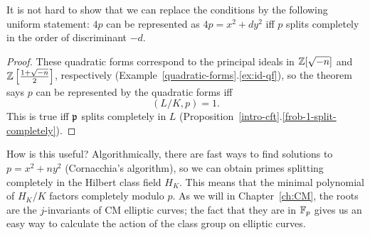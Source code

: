\begin{rem}
It is not hard to show that we can replace the conditions by the following uniform statement: $4p$ can be represented as $4p=x^2+dy^2$ iff $p$ splits completely in the order of discriminant $-d$. 
\end{rem}
\begin{proof}
These quadratic forms correspond to the principal ideals in $\mathbb{Z}[\sqrt{-n}]$ and $\mathbb{Z}\left[ {\frac{1+\sqrt{-n}}2} \right]$, respectively (Example~\ref{quadratic-forms}.\ref{ex:id-qf}), so the theorem says $p$ can be represented by the quadratic forms iff
\[
(L/K,p)=1.
\]
This is true iff $\mathfrak{p}$ splits completely in $L$ (Proposition~\ref{intro-cft}.\ref{frob-1-split-completely}).
\end{proof}
How is this useful? Algorithmically, there are fast ways to find solutions to $p=x^2+ny^2$ (Cornacchia's algorithm), so we can obtain primes splitting completely in the Hilbert class field $H_K$. This means that the minimal polynomial of $H_K/K$ factors completely modulo $p$. As we will in Chapter~\ref{ch:CM}, the roots are the $j$-invariants of CM elliptic curves; the fact that they are in $\mathbb{F}_p$ gives us an easy way to calculate the action of the class group on elliptic curves.

